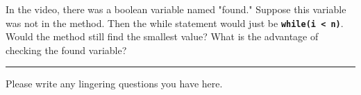 \documentclass[letterpaper,12pt]{exam}
\begin{document}
\begin{questions}
\begin{samepage}
    \question In the video, there was a boolean variable named "found."  Suppose this variable was not in the method.  Then the while statement would just be \texttt{\textbf{while(i < n)}}.  Would the method still find the smallest value?  What is the advantage of checking the found variable?
    \vspace{5mm}
\end{samepage}

\begin{center}
    \rule{0.5\textwidth}{.4pt}
\end{center}
Please write any lingering questions you have here.
\end{questions}
\end{document}

